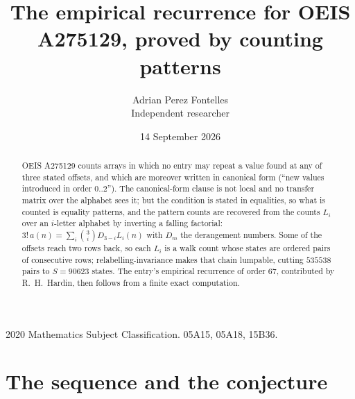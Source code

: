 \documentclass[11pt,a4paper]{article}
\title{The empirical recurrence for OEIS A275129, proved by counting patterns}
\author{Adrian Perez Fontelles\\ \small Independent researcher}
\date{14 September 2026}
\theoremstyle{plain}
\theoremstyle{definition}
\begin{document}
\maketitle

\begin{abstract}
OEIS A275129 counts arrays in which no entry may repeat a value found at any of three stated
offsets, and which are moreover written in canonical form (``new values introduced in order
$0..2$''). The canonical-form clause is not local and no transfer matrix over the
alphabet sees it; but the condition is stated in equalities, so what is counted is equality
patterns, and the pattern counts are recovered from the counts $L_i$ over an $i$-letter
alphabet by inverting a falling factorial:
$3!\,a(n)=\sum_i\binom{3}{i}D_{3-i}L_i(n)$ with $D_m$ the derangement numbers.
Some of the offsets reach two rows back, so each $L_i$ is a walk count whose states are
ordered pairs of consecutive rows; relabelling-invariance makes that chain lumpable,
cutting $535538$ pairs to $S=90623$ states. The entry's empirical recurrence of order $67$,
contributed by R.~H.~Hardin, then follows from a finite exact computation.
\end{abstract}

\noindent\small 2020 Mathematics Subject Classification. 05A15, 05A18, 15B36.\normalsize

\section{The sequence and the conjecture}
\end{document}
